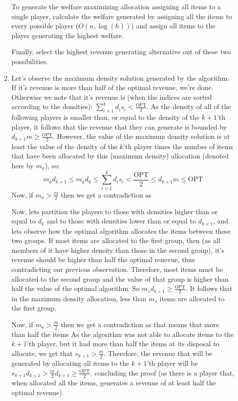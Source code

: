 \documentclass[a4page,notitlepage]{article}
\begin{document}
\begin{enumerate}
\begin{enumerate}
    To generate the welfare maximizing allocation assigning all items to a single player, calculate the welfare generated by assigning all the items to every possible player ($O(n,\log(h))$) and assign all items to the player generating the highest welfare.
    
    Finally, select the highest revenue generating alternative out of
    these two possibilities.
    \item
      Let's observe the maximum density solution generated by the algorithm.
      If it's revenue is more than half of the optimal revenue, we're done.
      Otherwise we note that it's revenue is (when the indices are sorted according to the densities): $\sum_{i=1}^kd_is_i<\frac{\text{OPT}}{2}$.
      As the density of all of the following players is smaller than, or equal to the density of the $k+1$'th player, it follows that the revenue that they can generate is bounded by $d_{k+1}m\geq \frac{\text{OPT}}{2}$.
      However, the value of the maximum density solution is at least the value of the density of the $k$'th player times the number of items that have been allocated by this (maximum density) allocation (denoted here by $m_a$), so:
      \begin{equation*}
        m_ad_{k+1}\leq m_ad_k\leq \sum_{i=1}^kd_is_i<\frac{\text{OPT}}{2}\leq d_{k+1}m\leq \text{OPT}
      \end{equation*}
      Now, if $m_a>\frac{m}{2}$ then we get a contradiction as 

      Now, lets partition the players to those with densities higher than or equal to $d_k$ and to those with densities lower than or equal to $d_{k+1}$, and lets observe how the optimal algorithm allocates the items between these two groups.
      If most items are allocated to the first group, then (as all members of it have higher density than those in the second group), it's revenue should be higher than half the optimal renevue, thus contradicting our previous observation.
      Therefore, most items must be allocated to the second group and the value of that group is higher than half the value of the optimal algorithm.
      So $m_sd_{k+1}\geq \frac{\text{OPT}}{2}$.
      It follows that in the maximum density allocation, less than $m_s$ items are allocated to the first group.

      Now, if $m_a > \frac{m}{2}$ then we get a contradiction as that means that more than half the items  
      As the algorithm was not able to allocate items to the $k+1$'th player, but it had more than half the items at its disposal to allocate, we get that $s_{k+1}>\frac{m}{2}$.
      Therefore, the revenue that will be generated by allocating all items to the $k+1$'th player will be $s_{k+1}d_{k+1}>\frac{m}{2}d_{k+1}\geq \frac{\text{OPT}}{2}$, concluding the proof (as there is a player that, when allocated all the items, generates a revenue of at least half the optimal revenue).


  \end{enumerate}
\end{enumerate}
\end{document}
